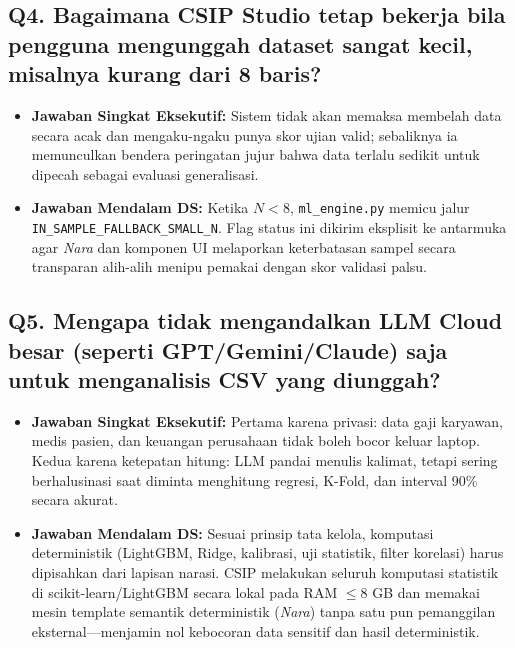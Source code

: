 \documentclass[11pt,a4paper,oneside]{book}
\newcommand{\code}[1]{{\small\nolinkurl{#1}}}
\begin{document}
\subsection*{Q4. Bagaimana CSIP Studio tetap bekerja bila pengguna mengunggah dataset sangat kecil, misalnya kurang dari 8 baris?}
\begin{itemize}
  \item \textbf{Jawaban Singkat Eksekutif:} Sistem tidak akan memaksa membelah data secara acak dan mengaku-ngaku punya skor ujian valid; sebaliknya ia memunculkan bendera peringatan jujur bahwa data terlalu sedikit untuk dipecah sebagai evaluasi generalisasi.
  \item \textbf{Jawaban Mendalam DS:} Ketika $N < 8$, \code{ml_engine.py} memicu jalur \code{IN_SAMPLE_FALLBACK_SMALL_N}. Flag status ini dikirim eksplisit ke antarmuka agar \emph{Nara} dan komponen UI melaporkan keterbatasan sampel secara transparan alih-alih menipu pemakai dengan skor validasi palsu.
\end{itemize}

\subsection*{Q5. Mengapa tidak mengandalkan LLM Cloud besar (seperti GPT/Gemini/Claude) saja untuk menganalisis CSV yang diunggah?}
\begin{itemize}
  \item \textbf{Jawaban Singkat Eksekutif:} Pertama karena privasi: data gaji karyawan, medis pasien, dan keuangan perusahaan tidak boleh bocor keluar laptop. Kedua karena ketepatan hitung: LLM pandai menulis kalimat, tetapi sering berhalusinasi saat diminta menghitung regresi, K-Fold, dan interval 90\% secara akurat.
  \item \textbf{Jawaban Mendalam DS:} Sesuai prinsip tata kelola, komputasi deterministik (LightGBM, Ridge, kalibrasi, uji statistik, filter korelasi) harus dipisahkan dari lapisan narasi. CSIP melakukan seluruh komputasi statistik di scikit-learn/LightGBM secara lokal pada RAM $\le 8$ GB dan memakai mesin template semantik deterministik (\emph{Nara}) tanpa satu pun pemanggilan eksternal---menjamin nol kebocoran data sensitif dan hasil deterministik.
\end{itemize}
\end{document}
